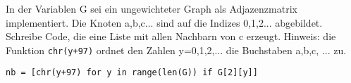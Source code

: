 ﻿\question[3]
In der Variablen G sei ein ungewichteter Graph als Adjazenzmatrix
implementiert.
Die Knoten a,b,c... sind auf die Indizes 0,1,2... abgebildet.
Schreibe Code, die eine Liste mit allen Nachbarn von c erzeugt.
Hinweis: die Funktion \texttt{chr(y+97)} ordnet den Zahlen y=0,1,2,... die Buchstaben
a,b,c, ... zu.

\begin{solutionbox}{2cm}
\begin{lstlisting}
nb = [chr(y+97) for y in range(len(G)) if G[2][y]]

\end{lstlisting}
\end{solutionbox}
